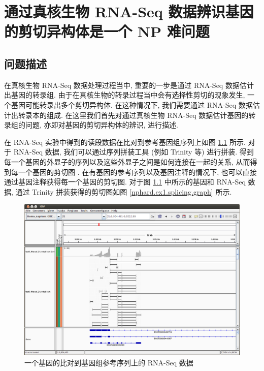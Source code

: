 \chapter{通过真核生物 RNA-Seq 数据辨识基因的剪切异构体是一个 NP 难问题}
\label{chap-rna-seq-nphard}

\section{问题描述}
在真核生物 RNA-Seq 数据处理过程当中, 重要的一步是通过 RNA-Seq 数据估计出基因的转录组. 
由于在真核生物的转录过程当中会有选择性剪切的现象发生, 一个基因可能转录出多个剪切异构体. 
在这种情况下, 我们需要通过 RNA-Seq 数据估计出转录本的组成. 
在这里我们首先对通过真核生物 RNA-Seq 数据估计基因的转录组的问题, 
亦即对基因的剪切异构体的辨识, 进行描述. 

在 RNA-Seq 实验中得到的读段数据在比对到参考基因组序列上如图 \ref{nphard.ex1.aligned.data} 所示. 
对于 RNA-Seq 数据, 
我们可以通过序列拼装工具 (例如 Trinity \cite{grabherr2011full} 等) 进行拼装. 
得到每一个基因的外显子的序列以及这些外显子之间是如何连接在一起的关系, 
从而得到每一个基因的剪切图 \cite{Heber01072002}. 
在有基因的参考序列以及基因注释的情况下, 也可以直接通过基因注释获得每一个基因的剪切图. 
对于图 \ref{nphard.ex1.aligned.data} 中所示的基因和 RNA-Seq 数据, 
通过 Trinity 拼装获得的剪切图如图 \ref{nphard.ex1.splicing.graph} 所示. 

\begin{figure}[!t]
\centering
\includegraphics[width=\textwidth]{figures/nphard/comp1.png}
\caption{一个基因的比对到基因组参考序列上的 RNA-Seq 数据}
\label{nphard.ex1.aligned.data}
\end{figure}

